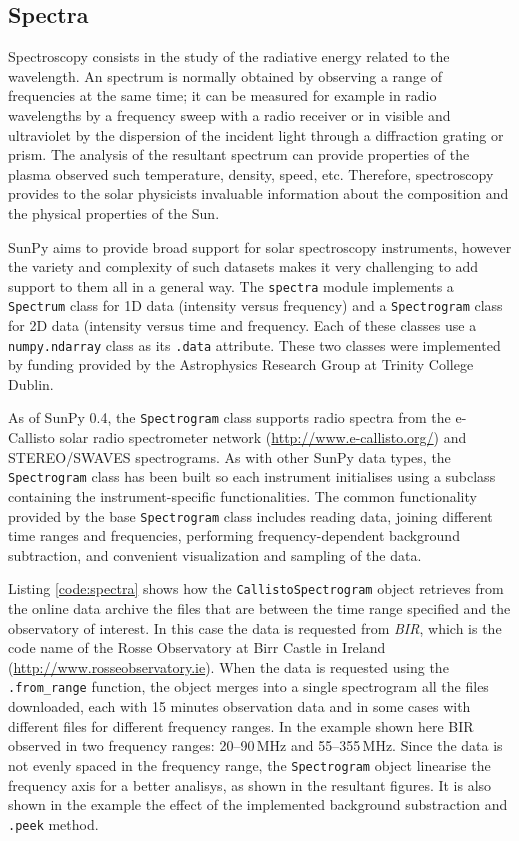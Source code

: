 \subsection{Spectra}\label{sec:spectra}

Spectroscopy consists in the study of the radiative energy related to the wavelength.
An spectrum is normally obtained by observing a range of frequencies at the same time; 
it can be measured for example in radio wavelengths by a frequency sweep with 
a radio receiver or in visible and ultraviolet by the dispersion of the incident light 
through a diffraction grating or prism.
The analysis of the resultant spectrum can provide properties of the plasma observed 
such temperature, density, speed, etc.
Therefore, spectroscopy provides to the solar physicists invaluable information about 
the composition and the physical properties of the Sun.  

SunPy aims to provide broad support for solar spectroscopy instruments, however the 
variety and complexity of such datasets makes it very challenging to add support to them all 
in a general way.
The \texttt{spectra} module implements a \texttt{Spectrum} class for 1D data
(intensity versus frequency) and a \texttt{Spectrogram} class for 2D data
(intensity versus time and frequency.
Each of these classes use a \texttt{numpy.ndarray} class as its \texttt{.data} attribute.
These two classes were implemented by funding provided by the Astrophysics Research 
Group at Trinity College Dublin.

As of SunPy 0.4, the \texttt{Spectrogram} class supports radio spectra from the e-Callisto 
solar radio spectrometer network (\url{http://www.e-callisto.org/})
and STEREO/SWAVES spectrograms.
As with other SunPy data types, the \texttt{Spectrogram} class has been
built so each instrument initialises using a subclass containing the instrument-specific 
functionalities.
The common functionality provided by the base \texttt{Spectrogram} class includes
reading data,
joining different time ranges and frequencies,
performing frequency-dependent background subtraction,
and convenient visualization and sampling of the data.

Listing \ref{code:spectra} shows how the \texttt{CallistoSpectrogram} object retrieves
from the online data archive the files that are between the time range specified and
the observatory of interest.  In this case the data is requested from \textit{BIR},
which is the code name of the
Rosse Observatory at Birr Castle in Ireland (\url{http://www.rosseobservatory.ie}).
When the data is requested using the \texttt{.from\_range} function, the object merges
into a single spectrogram all the files downloaded, each with 15 minutes observation data 
and in some cases with different files for different frequency ranges.  
In the example shown here BIR observed in two frequency ranges: 20--90\,MHz and 55--355\,MHz.
Since the data is not evenly spaced in the frequency range, the \texttt{Spectrogram} object
linearise the frequency axis for a better analisys, as shown in the resultant figures.
It is also shown in the example the effect of the implemented background substraction and
\texttt{.peek} method.

